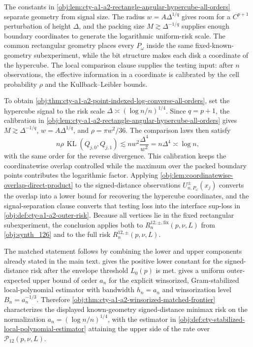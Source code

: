 The constants in \cref{obj:lem:cty-a1-a2-rectangle-angular-hypercube-all-orders} separate geometry from signal size. The radius \(w=A\Delta^{1/q}\) gives room for a \(C^{p+1}\) perturbation of height \(\Delta\), and the packing size \(M\gtrsim \Delta^{-1/q}\) supplies enough boundary coordinates to generate the logarithmic uniform-risk scale. The common rectangular geometry places every \(P_\omega\) inside the same fixed-known-geometry subexperiment, while the bit structure makes each disk a coordinate of the hypercube. The local comparison clause supplies the testing input: after \(n\) observations, the effective information in a coordinate is calibrated by the cell probability \(\rho\) and the Kullback--Leibler bounds.

To obtain \cref{obj:thm:cty-a1-a2-point-indexed-log-converse-all-orders}, set the hypercube signal to the risk scale \(\Delta\asymp(\log n/n)^{1/4}\). Since \(q=p+1\), the calibration in \cref{obj:lem:cty-a1-a2-rectangle-angular-hypercube-all-orders} gives \(M\gtrsim \Delta^{-1/q}\), \(w=A\Delta^{1/q}\), and \(\rho=\pi w^2/36\). The comparison laws then satisfy
\[
n\rho\,\operatorname{KL}(Q_{j,0},Q_{j,1})
\lesssim
n w^2 \frac{\Delta^4}{w^2}
=
n\Delta^4
\asymp
\log n,
\]
with the same order for the reverse divergence. This calibration keeps the coordinatewise overlap controlled while the maximum over the packed boundary points contributes the logarithmic factor. Applying \cref{obj:lem:coordinatewise-overlap-direct-product} to the signed-distance observations \(U^{\pm}_{n,P_\omega}(x_j)\) converts the overlap into a lower bound for recovering the hypercube coordinates, and the signal-separation clause converts that testing loss into the interface sup-loss in \cref{obj:def:cty-a1-a2-outer-risk}. Because all vertices lie in the fixed rectangular subexperiment, the conclusion applies both to \(R^{12,\pm,\mathrm{fix}}_n(p,\nu,L)\) from \cref{obj:synth_126} and to the full risk \(R^{12,\pm}_n(p,\nu,L)\).

The matched statement follows by combining the lower and upper components already stated in the main text.  gives the positive lower constant for the signed-distance risk after the envelope threshold \(L_0(p)\) is met.  gives a uniform outer-expected upper bound of order \(a_n\) for the explicit winsorized, Gram-stabilized local-polynomial estimator with bandwidth \(h_n=a_n\) and winsorization level \(B_n=a_n^{-1/3}\). Therefore \cref{obj:thm:cty-a1-a2-winsorized-matched-frontier} characterizes the displayed known-geometry signed-distance minimax risk on the normalization \(a_n=(\log n/n)^{1/4}\), with the estimator in \cref{obj:def:cty-stabilized-local-polynomial-estimator} attaining the upper side of the rate over \(\mathcal P_{12}(p,\nu,L)\).
